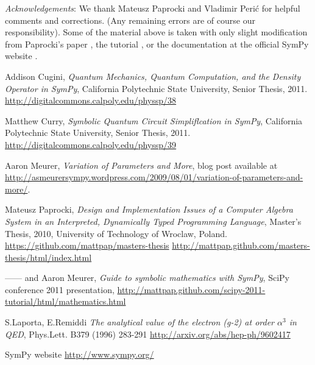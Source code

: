\documentclass[12pt]{article}
\begin{document}
\noindent
{\it Acknowledgements}:
We thank Mateusz Paprocki and Vladimir Peri\'c
for helpful comments and corrections. (Any remaining errors are of course our
responsibility). Some of the material above is taken
with only slight modification from Paprocki's paper
\cite{P}, the tutorial \cite{PM}, or the documentation at the official SymPy website
\cite{S}.



\begin{thebibliography}{99}

Addison Cugini,
{\it Quantum Mechanics, Quantum Computation, and the Density Operator in SymPy},
California Polytechnic State University, Senior Thesis, 2011.
\newline
\url{http://digitalcommons.calpoly.edu/physsp/38}

Matthew Curry,
{\it Symbolic Quantum Circuit Simpliflcation in SymPy},
California Polytechnic State University, Senior Thesis, 2011.
\newline
\url{http://digitalcommons.calpoly.edu/physsp/39}

 Aaron Meurer,
{\it Variation of Parameters and More}, blog post available at
\newline
\url{http://asmeurersympy.wordpress.com/2009/08/01/variation-of-parameters-and-more/}.

Mateusz Paprocki,
{\it  Design and Implementation Issues of a Computer Algebra System
in an Interpreted, Dynamically Typed Programming Language},
Master's Thesis, 2010, University of Technology of
Wroclaw,  Poland.
\newline
\url{https://github.com/mattpap/masters-thesis}
\newline
\url{http://mattpap.github.com/masters-thesis/html/index.html}

------ and Aaron Meurer,
{\it Guide to symbolic mathematics with SymPy},
SciPy conference 2011 presentation,
\newline
\url{http://mattpap.github.com/scipy-2011-tutorial/html/mathematics.html}

S.Laporta, E.Remiddi
{\it The analytical value of the electron (g-2) at order $\alpha^3$ in QED},
Phys.Lett. B379 (1996) 283-291
\newline
\url{http://arxiv.org/abs/hep-ph/9602417}


  SymPy website
\newline
\url{http://www.sympy.org/}



\end{thebibliography}
\end{document}
